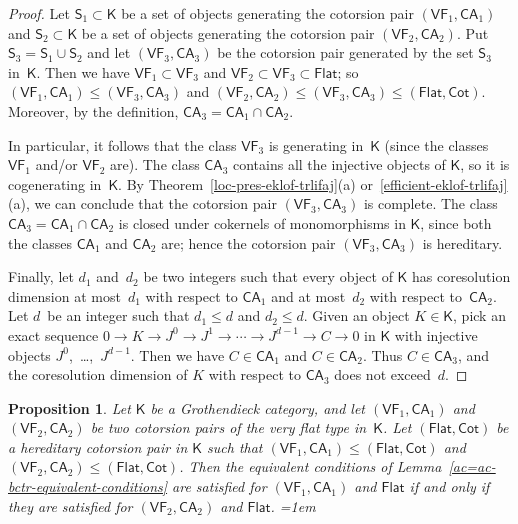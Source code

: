 \documentclass[12pt,a4paper]{amsart}
\newcommand{\+}{\nobreakdash-}
\renewcommand{\:}{\colon}
\newcommand{\rarrow}{\longrightarrow}
\newcommand{\sK}{\mathsf K}
\newcommand{\sS}{\mathsf S}
\newcommand{\VF}{\mathsf{VF}}
\newcommand{\CA}{\mathsf{CA}}
\newcommand{\Flat}{\mathsf{Flat}}
\newcommand{\Cot}{\mathsf{Cot}}
\theoremstyle{plain}
\newtheorem{prop}[thm]{Proposition}
\theoremstyle{definition}
\begin{document}
\begin{proof}
 Let $\sS_1\subset\sK$ be a set of objects generating the cotorsion pair
$(\VF_1,\CA_1)$ and $\sS_2\subset\sK$ be a set of objects generating
the cotorsion pair $(\VF_2,\CA_2)$.
 Put $\sS_3=\sS_1\cup\sS_2$ and let $(\VF_3,\CA_3)$ be the cotorsion
pair generated by the set $\sS_3$ in\/~$\sK$.
 Then we have $\VF_1\subset\VF_3$ and $\VF_2\subset\VF_3\subset\Flat$;
so $(\VF_1,\CA_1)\le(\VF_3,\CA_3)$ and $(\VF_2,\CA_2)\le(\VF_3,\CA_3)
\le(\Flat,\Cot)$.
 Moreover, by the definition, $\CA_3=\CA_1\cap\CA_2$.

 In particular, it follows that the class $\VF_3$ is generating in~$\sK$
(since the classes $\VF_1$ and/or $\VF_2$ are).
 The class $\CA_3$ contains all the injective objects of $\sK$, so it
is cogenerating in~$\sK$.
 By Theorem~\ref{loc-pres-eklof-trlifaj}(a)
or~\ref{efficient-eklof-trlifaj}(a), we can conclude that the cotorsion
pair $(\VF_3,\CA_3)$ is complete.
 The class $\CA_3=\CA_1\cap\CA_2$ is closed under cokernels of
monomorphisms in $\sK$, since both the classes $\CA_1$ and $\CA_2$ are;
hence the cotorsion pair $(\VF_3,\CA_3)$ is hereditary.

 Finally, let $d_1$ and~$d_2$ be two integers such that every object
of $\sK$ has coresolution dimension at most~$d_1$ with respect to
$\CA_1$ and at most~$d_2$ with respect to~$\CA_2$.
 Let $d$~be an integer such that $d_1\le d$ and $d_2\le d$.
 Given an object $K\in\sK$, pick an exact sequence $0\rarrow K\rarrow
J^0\rarrow J^1\rarrow\dotsb\rarrow J^{d-1}\rarrow C\rarrow0$ in $\sK$
with injective objects $J^0$,~\dots,~$J^{d-1}$.
 Then we have $C\in\CA_1$ and $C\in\CA_2$.
 Thus $C\in\CA_3$, and the coresolution dimension of $K$ with respect
to $\CA_3$ does not exceed~$d$.
\end{proof}

\begin{prop} \label{independent-of-very-flat-prop}
 Let\/ $\sK$ be a Grothendieck category, and let $(\VF_1,\CA_1)$ and
$(\VF_2,\CA_2)$ be two cotorsion pairs of the very flat type in\/~$\sK$.
 Let $(\Flat,\Cot)$ be a hereditary cotorsion pair in\/ $\sK$ such that
$(\VF_1,\CA_1)\le(\Flat,\Cot)$ and $(\VF_2,\CA_2)\le(\Flat,\Cot)$.
 Then the equivalent conditions of
Lemma~\ref{ac=ac-bctr-equivalent-conditions} are satisfied for
$(\VF_1,\CA_1)$ and\/ $\Flat$ if and only if they are satisfied for
$(\VF_2,\CA_2)$ and\/ $\Flat$.  \emergencystretch=1em
\end{prop}
\end{document}
